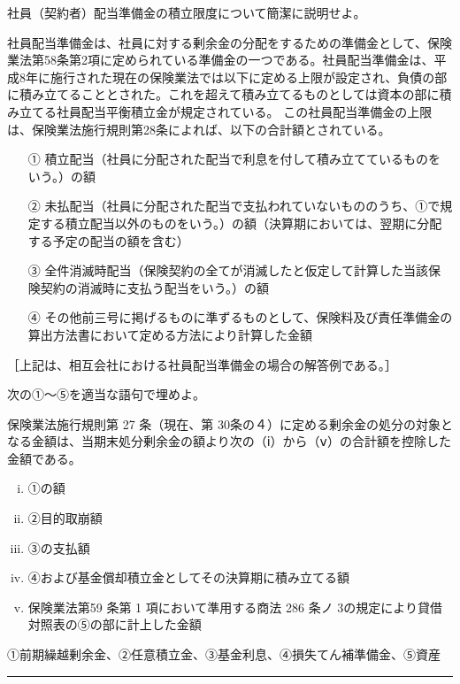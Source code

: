 \documentclass[report,gutter=10mm,fore-edge=10mm,uplatex,dvipdfmx]{jlreq}
\begin{document}
社員（契約者）配当準備金の積立限度について簡潔に説明せよ。


社員配当準備金は、社員に対する剰余金の分配をするための準備金として、保険業法第58条第2項に定められている準備金の一つである。社員配当準備金は、平成8年に施行された現在の保険業法では以下に定める上限が設定され、負債の部に積み立てることとされた。これを超えて積み立てるものとしては資本の部に積み立てる社員配当平衡積立金が規定されている。
この社員配当準備金の上限は、保険業法施行規則第28条によれば、以下の合計額とされている。
\begin{enumerate}
\item [①] 積立配当（社員に分配された配当で利息を付して積み立てているものをいう。）の額
\item [②] 未払配当（社員に分配された配当で支払われていないもののうち、①で規定する積立配当以外のものをいう。）の額（決算期においては、翌期に分配する予定の配当の額を含む）
\item [③] 全件消滅時配当（保険契約の全てが消滅したと仮定して計算した当該保険契約の消滅時に支払う配当をいう。）の額
\item [④] その他前三号に掲げるものに準ずるものとして、保険料及び責任準備金の算出方法書において定める方法により計算した金額
\end{enumerate}

［上記は、相互会社における社員配当準備金の場合の解答例である。］


次の①～⑤を適当な語句で埋めよ。 

保険業法施行規則第 27 条（現在、第 30条の４）に定める剰余金の処分の対象となる金額は、当期末処分剰余金の額より次の（ⅰ）から（ⅴ）の合計額を控除した金額である。

\begin{enumerate} [(i) ]
\item ①の額 
\item ②目的取崩額 
\item ③の支払額
\item ④および基金償却積立金としてその決算期に積み立てる額 
\item 保険業法第59 条第 1 項において準用する商法 286 条ノ 3の規定により貸借対照表の⑤の部に計上した金額
\end{enumerate}


①前期繰越剰余金、②任意積立金、③基金利息、④損失てん補準備金、⑤資産

\begin{center}\rule{0.5\linewidth}{0.5pt}\end{center}
\end{document}
